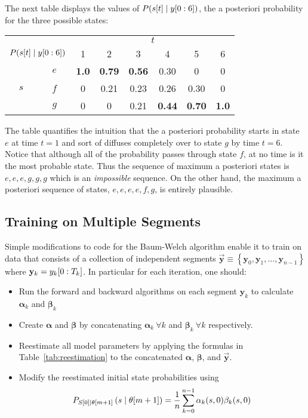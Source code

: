 The next table displays the values of $P({s}{[t]}\mid y[0:6])$, the
a posteriori probability for the three possible states:
\begin{center}
  \begin{tabular}{cc|cccccc}
    &   & \multicolumn{6}{c}{$t$} \\
    \multicolumn{2}{r|}{$P({s}{[t]}\mid y[0:6])$}
        & 1 & 2 & 3 & 4 & 5 & 6 \\
    \hline
    & $e$ & \textbf{1.0} & \textbf{0.79} & \textbf{0.56} & 0.30 & 0    & 0  \\
$s$ & $f$ & 0   & 0.21 & 0.23 & 0.26 & 0.30 & 0   \\
    & $g$ & 0   & 0    & 0.21 & \textbf{0.44} & \textbf{0.70} & \textbf{1.0}
  \end{tabular}
\end{center}
The table quantifies the intuition that the a posteriori probability starts
in state $e$ at time $t=1$ and sort of diffuses completely over to
state $g$ by time $t=6$.  Notice that although all of the probability
passes through state $f$, at no time is it the most probable state.
Thus the sequence of maximum a posteriori states is $e,e,e,g,g,g$ which is
an \emph{impossible} sequence.  On the other hand, the maximum a posteriori
sequence of states, $e,e,e,e,f,g$, is entirely plausible.

\subsection{Training on Multiple Segments}
\label{sec:MultiSegment}


Simple modifications to code for the Baum-Welch algorithm enable it to
train on data that consists of a collection of independent segments
$\mathbf{\vec y} \equiv \left\{ \mathbf{y}_0, \mathbf{y}_1, \ldots,
  \mathbf{y}_{n-1} \right\}$ where $ \mathbf{y}_k = y_k[0:T_k]$.
In particular for each iteration, one should:
\begin{itemize}
\item Run the forward and backward algorithms on each segment
  $\mathbf{y}_k$ to calculate ${\bm \alpha}_k$ and
  ${\bm \beta}_k$
\item Create ${\bm \alpha}$ and ${\bm \beta}$ by concatenating
  ${\bm \alpha}_k~\forall k$ and ${\bm \beta}_k~\forall k$
  respectively.
\item Reestimate all model parameters by applying the formulas in
  Table~\ref{tab:reestimation} to the concatenated  ${\bm \alpha}$,
  ${\bm \beta}$, and $\mathbf{\vec y}$.
\item Modify the reestimated initial state probabilities using
  \begin{equation*}
    P_{{S}{[0]}\mid {\theta}{[m+1]}} \left(s\mid {\theta}{[m+1]}
    \right) = \frac{1}{n} \sum_{k=0}^{n-1} \alpha_k(s,0) \beta_k(s,0)
  \end{equation*}
\end{itemize}

